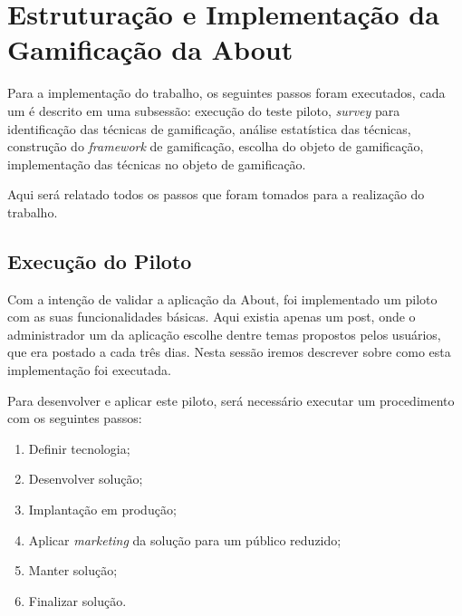 \chapter[Estruturação e Implementação da Gamificação da About]{Estruturação e Implementação da Gamificação da About}

Para a implementação do trabalho, os seguintes
passos foram executados, cada um é
descrito em uma subsessão: execução do teste piloto, \textit{survey} para identificação das técnicas de gamificação,
análise estatística das técnicas, construção do \textit{framework} de gamificação, escolha do objeto de gamificação,
implementação das técnicas no objeto de gamificação.

Aqui será relatado todos os passos que foram tomados para a realização do trabalho.




\section{Execução do Piloto}
\label{sec:execucao_do_piloto}
Com a intenção de validar a aplicação da About, foi implementado um piloto com as suas funcionalidades
básicas. Aqui existia apenas um post, onde o administrador um da aplicação escolhe dentre temas propostos
pelos usuários, que era postado a cada três dias.
Nesta sessão iremos descrever sobre como esta implementação foi executada.

Para desenvolver e aplicar este piloto, será necessário executar um procedimento
com os seguintes passos:

\begin{enumerate}
    \item Definir tecnologia;
    \item Desenvolver solução;
    \item Implantação em produção;
    \item Aplicar \textit{marketing} da solução para um público reduzido;
    \item Manter solução;
    \item Finalizar solução.
\end{enumerate}


